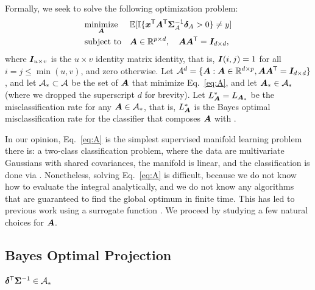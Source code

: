 \documentclass[10pt]{article}
\begin{document}
Formally, we seek to solve the following optimization problem:
\begin{equation} \label{eq:A}
\begin{aligned}
& \underset{\boldsymbol{A}}{\text{minimize}}
& & \mathbb{E} [ \mathbb{I} \{ \boldsymbol{x}^{\mathsf{T}} \boldsymbol{A}^{\mathsf{T}} \boldsymbol{\Sigma}^{-1}_A \boldsymbol{\delta}_A > 0\} \neq y] \\
& \text{subject to} & & \boldsymbol{A} \in \mathbb{R}^{p \times d}, \quad \boldsymbol{A} \boldsymbol{A}^{\mathsf{T}} = \boldsymbol{I}_{d \times d},
\end{aligned}
\end{equation}
where $\boldsymbol{I}_{u \times v}$ is the $u \times v$ identity matrix identity, that is, $\boldsymbol{I}(i,j)=1$ for all $i=j \leq \min(u,v)$, and zero otherwise.
Let $\mathcal{A}^d=\{\boldsymbol{A} : \boldsymbol{A} \in \mathbb{R}^{d \times p}, \boldsymbol{A} \boldsymbol{A}^{\mathsf{T}} = \boldsymbol{I}_{d \times d}\}$, and let $\mathcal{A}_* \subset \mathcal{A}$ be the set of $\boldsymbol{A}$  that minimize Eq.~\eqref{eq:A}, and let $\boldsymbol{A}_* \in \mathcal{A}_*$ (where we dropped the superscript $d$ for brevity).   Let $L_{\boldsymbol{A}}^*=L_{\boldsymbol{A}_*}$ be the misclassification rate for any $\boldsymbol{A} \in \mathcal{A}_*$, that is, $L_{\boldsymbol{A}}^*$ is the Bayes optimal misclassification rate for the classifier that composes $\boldsymbol{A}$ with \Lda.


In our opinion, Eq.~\eqref{eq:A} is the simplest supervised manifold learning problem there is: a two-class classification problem, where the data are multivariate Gaussians with shared covariances, the manifold is linear, and the classification is done via \Lda.
Nonetheless, solving Eq.~\eqref{eq:A} is difficult, because we do not know how to evaluate the integral analytically, and we do not know any algorithms that are guaranteed to find the global optimum in finite time.  This has led to previous work using a surrogate function \cite{not sure who}.
We proceed by studying a few natural choices for $\boldsymbol{A}$.





\subsection{Bayes Optimal Projection}

\begin{lem}
$\boldsymbol{\delta}^{\mathsf{T}}  \boldsymbol{\Sigma}^{-1} \in \mathcal{A}_*$
\end{lem}
\end{document}
